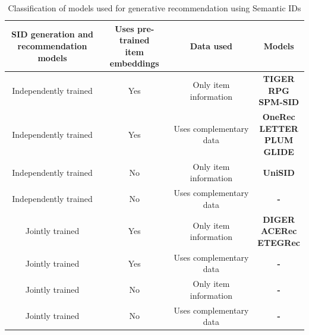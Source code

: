 \documentclass[11pt,a4paper]{article}
\begin{document}
\begin{table}
\centering
\begin{tabular}{| c | c | c | c |} 
 \hline
 \makecell{\textbf{SID generation and} \\ \textbf{recommendation models}} & \makecell{\textbf{Uses pre-trained} \\ \textbf{item embeddings}} & \textbf{Data used} & \textbf{Models}\\
 \hline
 Independently trained & Yes & Only item information & \makecell{
 \textbf{TIGER}\cite{2023TIGER_rajput2023recommendersystemsgenerativeretrieval}\\
 \textbf{RPG}\cite{2025RPG_hou2025generatinglongsemanticids}\\
 \textbf{SPM-SID}\cite{2023SPMSID_singh2024bettergeneralizationsemanticids}\\
 }\\
 \hline
 Independently trained & Yes & Uses complementary data & \makecell{
 \textbf{OneRec}\cite{2025OneRec_deng2025onerecunifyingretrieverank}\\
 \textbf{LETTER}\cite{2024LETTER_wang2025learnableitemtokenizationgenerative}\\
 \textbf{PLUM}\cite{2025PLUM_he2025plumadaptingpretrainedlanguage}\\
 \textbf{GLIDE}\cite{2026GLIDE_damico2026deployingsemanticidbasedgenerative}
 }\\
 \hline
 Independently trained & No & Only item information & \textbf{UniSID\cite{2026UniSID_jiang2026endtoendsemanticidgeneration}}\\
 \hline
 Independently trained & No & Uses complementary data & \textbf{-}\\
 \hline
 Jointly trained & Yes & Only item information & \makecell{
 \textbf{DIGER}\cite{2026DIGER_fu2026differentiablesemanticidgenerative}\\
 \textbf{ACERec}\cite{2026ACERec_xia2026unleashpotentiallongsemantic}\\
 \textbf{ETEGRec}\cite{2024ETEGRec_liu2025generativerecommenderendtoendlearnable}
 }\\
 \hline
 Jointly trained & Yes & Uses complementary data & \textbf{-}\\
 \hline
 Jointly trained & No & Only item information & \textbf{-}\\
 \hline
 Jointly trained & No & Uses complementary data & \textbf{-}\\
 \hline
\end{tabular}
\caption{Classification of models used for generative recommendation using Semantic IDs}
\label{table:ModelClassification}
\end{table}
\end{document}

